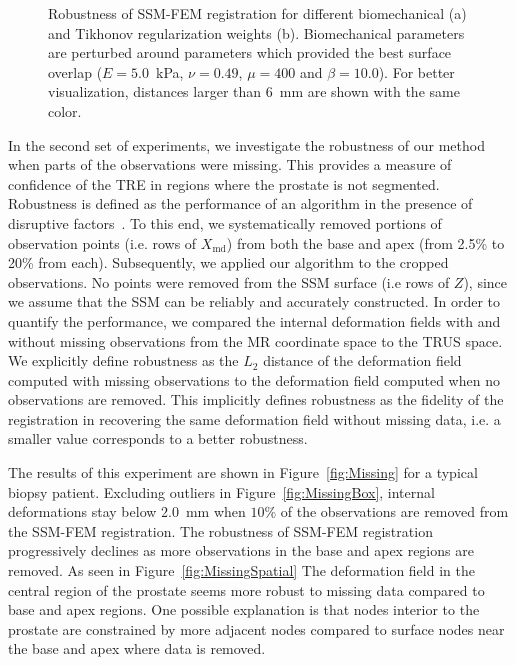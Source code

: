 \documentclass[journal]{IEEEtran}
\begin{document}
\begin{figure}[t]
	\caption{Robustness of SSM-FEM registration for different biomechanical (a) and Tikhonov regularization weights (b). Biomechanical parameters are perturbed around parameters which provided the best surface overlap ($E=5.0$~kPa, $\nu=0.49$, $\mu=400$ and $\beta=10.0$). For better visualization, distances larger than 6~mm are shown with the same color.}\label{fig:Perturb}
\end{figure}
In the second set of experiments, we investigate the robustness of our method when parts of the observations were missing. This provides a measure of confidence of the TRE in regions where the prostate is not segmented. Robustness is defined as the performance of an algorithm in the presence of disruptive factors~\cite{Jannin02a}. To this end, we systematically removed portions of observation points (i.e. rows of $X_\mathrm{md}$) from both the base and apex (from 2.5\% to 20\% from each). Subsequently, we applied our algorithm to the cropped observations. No points were removed from the SSM surface (i.e rows of $Z$), since we assume that the SSM can be reliably and accurately constructed. In order to quantify the performance, we compared the internal deformation fields with and without missing observations from the MR coordinate space to the TRUS space. We explicitly define robustness as the $L_2$ distance of the deformation field computed with missing observations to the deformation field computed when no observations are removed. This implicitly defines robustness as the fidelity of the registration in recovering the same deformation field without missing data, i.e. a smaller value corresponds to a better robustness. 

The results of this experiment are shown in Figure~\ref{fig:Missing} for a typical biopsy patient. Excluding outliers in Figure~\ref{fig:MissingBox}, internal deformations stay below $2.0$~mm when $10\%$ of the observations are removed from the SSM-FEM registration. The robustness of SSM-FEM registration progressively declines as more observations in the base and apex regions are removed. As seen in Figure~\ref{fig:MissingSpatial} The deformation field in the central region of the prostate seems more robust to missing data compared to base and apex regions. One possible explanation is that nodes interior to the prostate are constrained by more adjacent nodes compared to surface nodes near the base and apex where data is removed.
\end{document}
